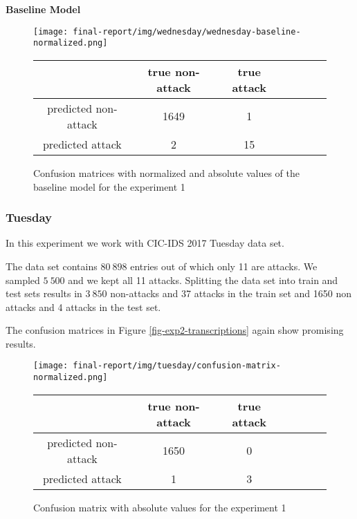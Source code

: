 \documentclass{article}
\begin{document}
\vspace{0.5cm}
\noindent\textbf{Baseline Model}


\begin{figure}[h!]
    \centering
    \texttt{[image: final-report/img/wednesday/wednesday-baseline-normalized.png]}

    \centering
    \begin{tabular}{ |c|c|c|c|c|c|c| }
     \hline
      & true non-attack & true attack \\
     \hline
     predicted non-attack & 1649 & 1 \\
     \hline
     predicted attack & 2 & 15 \\
     \hline
    \end{tabular}
    \caption{Confusion matrices with normalized and absolute values of the baseline model for the experiment 1}
    \label{fig-exp2-baseline}
\end{figure}


\clearpage

\subsubsection{Tuesday}
In this experiment we work with CIC-IDS 2017 Tuesday data set.

The data set contains $80\ 898$ entries out of which only 11 are attacks. We sampled $5\ 500$ and we kept all 11 attacks. Splitting the data set into train and test sets results in $3\ 850$ non-attacks and 37 attacks in the train set and 1650 non attacks and 4 attacks in the test set.

The confusion matrices in Figure \ref{fig-exp2-transcriptions} again show promising results.

\begin{figure}[h!]
    \centering
    \texttt{[image: final-report/img/tuesday/confusion-matrix-normalized.png]}

    \centering
    \begin{tabular}{ |c|c|c|c|c|c|c| }
     \hline
      & true non-attack & true attack \\
     \hline
     predicted non-attack & 1650 & 0 \\
     \hline
     predicted attack & 1 & 3 \\
     \hline
    \end{tabular}
    \caption{Confusion matrix with absolute values for the experiment 1}
    \label{fig-exp3-transcriptions}
\end{figure}
\end{document}
